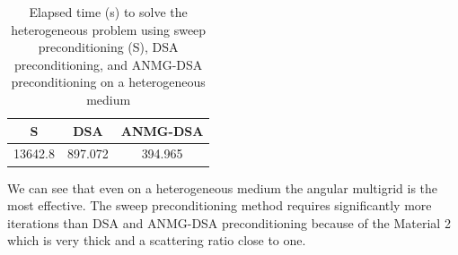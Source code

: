 \begin{table}[H]
  \begin{center}
    \caption{Elapsed time (s) to solve the heterogeneous problem using sweep
    preconditioning (S), DSA preconditioning, and ANMG-DSA preconditioning on
    a heterogeneous medium}
    \begin{tabular}{|c|c|c|}
      \hline
      S & DSA & ANMG-DSA \\
      \hline
      13642.8 & 897.072& 394.965 \\
      \hline
    \end{tabular}
    \label{table_time_heter}
  \end{center}
\end{table}
We can see that even on a heterogeneous medium the angular multigrid is the
most effective. The sweep preconditioning method requires significantly more
iterations than DSA and ANMG-DSA preconditioning because of the Material 2
which is very thick and a scattering ratio close to one.
